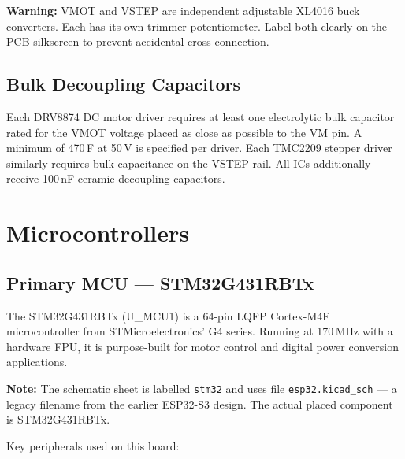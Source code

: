 \documentclass[11pt,a4paper]{article}
\begin{document}
\begin{warningbox}
\textbf{Warning:} VMOT and VSTEP are independent adjustable XL4016 buck converters. Each has its own trimmer potentiometer. Label both clearly on the PCB silkscreen to prevent accidental cross-connection.
\end{warningbox}

\subsection{Bulk Decoupling Capacitors}

Each DRV8874 DC motor driver requires at least one electrolytic bulk capacitor rated for the VMOT voltage placed as close as possible to the VM pin. A minimum of 470\,\textmu F at 50\,V is specified per driver. Each TMC2209 stepper driver similarly requires bulk capacitance on the VSTEP rail. All ICs additionally receive 100\,nF ceramic decoupling capacitors.

\section{Microcontrollers}

\subsection{Primary MCU --- STM32G431RBTx}

The STM32G431RBTx (U\_MCU1) is a 64-pin LQFP Cortex-M4F microcontroller from STMicroelectronics' G4 series. Running at 170\,MHz with a hardware FPU, it is purpose-built for motor control and digital power conversion applications.

\begin{warningbox}
\textbf{Note:} The schematic sheet is labelled \texttt{stm32} and uses file \texttt{esp32.kicad\_sch} — a legacy filename from the earlier ESP32-S3 design. The actual placed component is STM32G431RBTx.
\end{warningbox}

Key peripherals used on this board:
\end{document}
